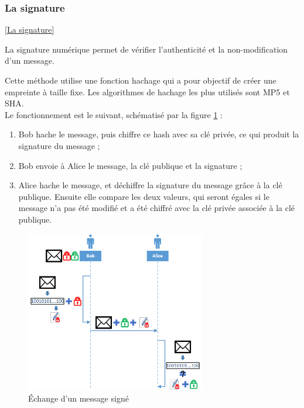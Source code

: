 
\subsubsection{La signature}
\ref{La signature}

La signature numérique permet de vérifier l'authenticité et la non-modification d'un message.

Cette méthode utilise une fonction hachage qui a pour objectif de créer une empreinte à taille fixe.
Les algorithmes de hachage les plus utilisés sont MP5 et SHA.
\\

Le fonctionnement est le suivant, schématisé par la figure \ref{signature} :
\begin{enumerate}
	\item Bob hache le message, puis chiffre ce hash avec sa clé privée, ce qui produit la signature du message ;
	\item Bob envoie à Alice le message, la clé publique et la signature ;
	\item Alice hache le message, et déchiffre la signature du message grâce à la clé publique. Ensuite elle compare les deux valeurs, qui seront égales si le message n'a pas été modifié et a été chiffré avec la clé privée associée à la clé publique.
\end{enumerate}
\begin{figure}[!h]
	\center
	\includegraphics[width=0.7\textwidth]{img/signature.png}
	\caption{Échange d'un message signé}
	\label{signature}
\end{figure}


